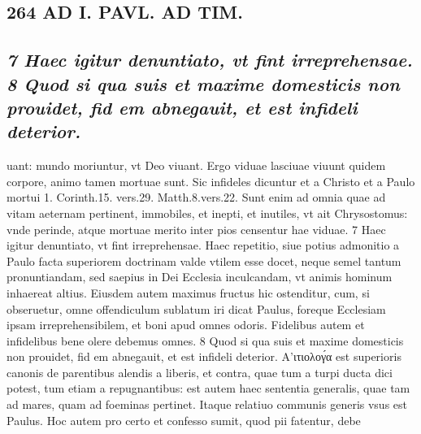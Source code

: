 \documentclass{article}
\begin{document}
\begin{pages}
\section*{264 AD I. PAVL. AD TIM. }\pstart {}
{}
\subsection*{\textit{7 Haec igitur denuntiato, vt fint irreprehensae. 8 Quod si qua suis et maxime domesticis non prouidet, fid em abnegauit, et est infideli deterior.}}uant: mundo moriuntur, vt Deo viuant. Ergo viduae lasciuae viuunt quidem corpore, animo tamen mortuae sunt. Sic infideles dicuntur et a Christo et a Paulo mortui 1. Corinth.15. vers.29. Matth.8.vers.22. Sunt enim ad omnia quae ad vitam aeternam pertinent, immobiles, et inepti, et inutiles, vt ait Chrysostomus: vnde perinde, atque mortuae merito inter pios censentur hae viduae. 7 Haec igitur denuntiato, vt fint irreprehensae. Haec repetitio, siue potius admonitio a Paulo facta superiorem doctrinam valde vtilem esse docet, neque semel tantum pronuntiandam, sed saepius in Dei Ecclesia inculcandam, vt animis hominum inhaereat altius. Eiusdem autem maximus fructus hic ostenditur, cum, si obseruetur, omne offendiculum sublatum iri dicat Paulus, foreque Ecclesiam ipsam irreprehensibilem, et boni apud omnes odoris. Fidelibus autem et infidelibus bene olere debemus omnes. 8 Quod si qua suis et maxime domesticis non prouidet, fid em abnegauit, et est infideli deterior. Α’ιτιολογ́α est superioris canonis de parentibus alendis a liberis, et contra, quae tum a turpi ducta dici potest, tum etiam a repugnantibus: est autem haec sententia generalis, quae tam ad mares, quam ad foeminas pertinet. Itaque relatiuo communis generis vsus est Paulus. Hoc autem pro certo et confesso sumit, quod pii fatentur, debe\pend

\end{pages}
\end{document}
